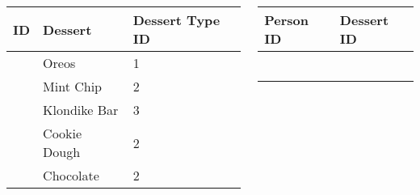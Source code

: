 \documentclass{beamer}
\begin{document}
\begin{frame}
  \begin{columns}[T]
    \begin{column}{0.3\textwidth}
      \begin{table}[]
        \footnotesize
        \begin{tabular}{@{}llp{5em}@{}}
          \toprule
          ID              & Dessert      & Dessert Type ID \\ \midrule
          \color{blue}{1} & Oreos        & 1               \\
          \color{blue}{2} & Mint Chip    & 2               \\
          \color{blue}{3} & Klondike Bar & 3               \\
          \color{blue}{4} & Cookie Dough & 2               \\
          \color{blue}{5} & Chocolate    & 2               \\ \bottomrule
        \end{tabular}
      \end{table}
    \end{column}
    \begin{column}{0.5\textwidth}
      \begin{table}[]
        \footnotesize
        \begin{tabular}{@{}ll@{}}
          \toprule
          Person ID         & Dessert ID        \\ \midrule
          \color{purple}{1} & \color{purple}{1} \\
          \color{purple}{1} & \color{purple}{2} \\
          \color{purple}{2} & \color{purple}{3} \\
          \color{purple}{3} & \color{purple}{2} \\
          \color{purple}{4} & \color{purple}{4} \\
          \color{purple}{5} & \color{purple}{5} \\ \bottomrule
        \end{tabular}
      \end{table}
    \end{column}
  \end{columns}
\end{frame}
\end{document}
